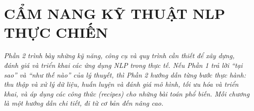 \part{CẨM NANG KỸ THUẬT NLP THỰC CHIẾN}
\setcounter{chapter}{0}
\textit{Phần 2 trình bày những kỹ năng, công cụ và quy trình cần thiết để xây dựng, đánh giá và triển khai các ứng dụng NLP trong thực tế. Nếu Phần 1 trả lời ``tại sao'' và ``như thế nào'' của lý thuyết, thì Phần 2 hướng dẫn từng bước thực hành: thu thập và xử lý dữ liệu, huấn luyện và đánh giá mô hình, tối ưu hóa và triển khai, và áp dụng các công thức (recipes) cho những bài toán phổ biến. Mỗi chương là một hướng dẫn chi tiết, đi từ cơ bản đến nâng cao.}
